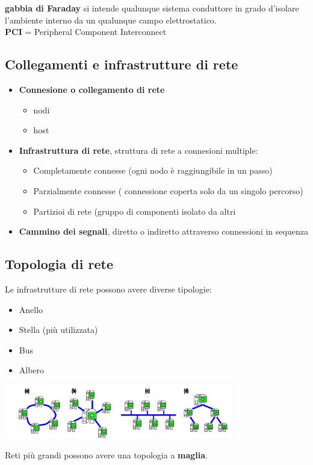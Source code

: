 \documentclass{article}
\begin{document}
\textbf{gabbia di Faraday} si intende qualunque sistema conduttore in grado d'isolare l'ambiente interno da un qualunque campo elettrostatico.\\
 \textbf{PCI} = Peripheral Component Interconnect

\subsection{Collegamenti e infrastrutture di rete}
\begin{itemize}
    \item \textbf{Connesione o collegamento di rete}
    \begin{itemize}
        \item nodi
        \item host
    \end{itemize}
    \item \textbf{Infrastruttura di rete}, struttura di rete a connesioni multiple:
    \begin{itemize}
        \item Completamente connesse (ogni nodo è raggiungibile in un passo)
        \item Parzialmente connesse ( connessione coperta solo da un singolo percorso)
        \item Partizioi di rete (gruppo di componenti isolato da altri
    \end{itemize}
    \item \textbf{Cammino dei segnali}, diretto o indiretto attraverso connessioni in sequenza
\end{itemize}

\subsection{Topologia di rete}
Le infrastrutture di rete possono avere diverse tipologie: 
\begin{itemize}
    \item Anello
    \item Stella (più utilizzata)
    \item Bus
    \item Albero
\end{itemize}

\begin{center}
    \includegraphics[width=10cm]{img/topologie.png}
\end{center}
Reti più grandi possono avere una topologia a \textbf{maglia}.
\end{document}
